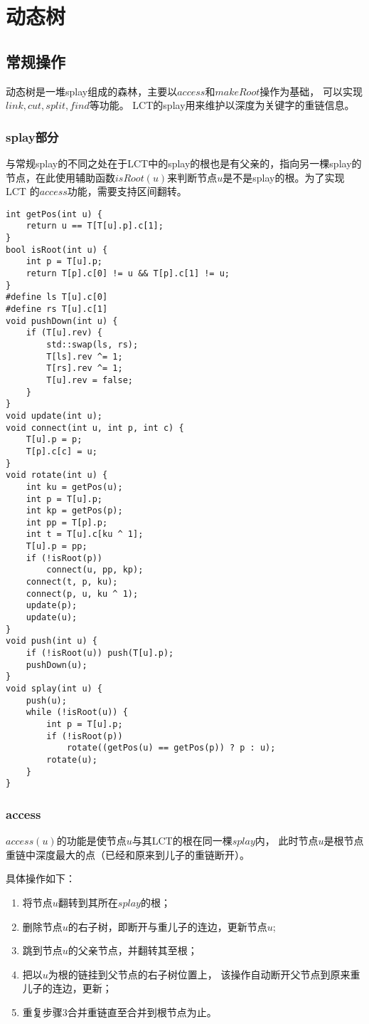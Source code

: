 \section{动态树}
\subsection{常规操作}
动态树是一堆splay组成的森林，主要以$access$和$makeRoot$操作为基础，
可以实现$link,cut,split,find$等功能。
LCT的splay用来维护以深度为关键字的重链信息。

\subsubsection{splay部分}
与常规splay的不同之处在于LCT中的splay的根也是有父亲的，指向另一棵splay的
节点，在此使用辅助函数$isRoot(u)$来判断节点$u$是不是splay的根。为了实现LCT
的$access$功能，需要支持区间翻转。

\begin{lstlisting}[title=splay]
int getPos(int u) {
    return u == T[T[u].p].c[1];
}
bool isRoot(int u) {
    int p = T[u].p;
    return T[p].c[0] != u && T[p].c[1] != u;
}
#define ls T[u].c[0]
#define rs T[u].c[1]
void pushDown(int u) {
    if (T[u].rev) {
        std::swap(ls, rs);
        T[ls].rev ^= 1;
        T[rs].rev ^= 1;
        T[u].rev = false;
    }
}
void update(int u);
void connect(int u, int p, int c) {
    T[u].p = p;
    T[p].c[c] = u;
}
void rotate(int u) {
    int ku = getPos(u);
    int p = T[u].p;
    int kp = getPos(p);
    int pp = T[p].p;
    int t = T[u].c[ku ^ 1];
    T[u].p = pp;
    if (!isRoot(p))
        connect(u, pp, kp);
    connect(t, p, ku);
    connect(p, u, ku ^ 1);
    update(p);
    update(u);
}
void push(int u) {
    if (!isRoot(u)) push(T[u].p);
    pushDown(u);
}
void splay(int u) {
    push(u);
    while (!isRoot(u)) {
        int p = T[u].p;
        if (!isRoot(p))
            rotate((getPos(u) == getPos(p)) ? p : u);
        rotate(u);
    }
}
\end{lstlisting}
\subsubsection{access}
$access(u)$的功能是使节点$u$与其LCT的根在同一棵$splay$内，
此时节点$u$是根节点重链中深度最大的点（已经和原来到儿子的重链断开）。

具体操作如下：

\begin{enumerate}
    \item 将节点$u$翻转到其所在$splay$的根；
    \item 删除节点$u$的右子树，即断开与重儿子的连边，更新节点$u$;
    \item 跳到节点$u$的父亲节点，并翻转其至根；
    \item 把以$u$为根的链挂到父节点的右子树位置上，
        该操作自动断开父节点到原来重儿子的连边，更新；
    \item 重复步骤3合并重链直至合并到根节点为止。
\end{enumerate}


